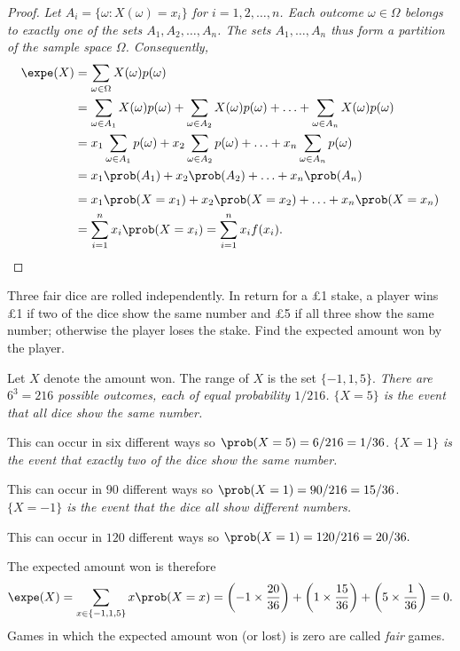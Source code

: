 \begin{proof}
\bit
\it Let $A_i = \{\omega: X(\omega) = x_i\}$ for $i=1,2,\ldots,n$.
\it Each outcome $\omega\in\Omega$ belongs to exactly one of the sets $A_1,A_2,\ldots,A_n$.
\it The sets $A_1,\ldots,A_n$ thus form a partition of the sample space $\Omega$.
\eit
Consequently, 
\begin{align*}
\expe(X) 
	& = \sum_{\omega\in\Omega} X(\omega)p(\omega) \\
	& = \sum_{\omega\in A_1} X(\omega)p(\omega) + \sum_{\omega\in A_2} X(\omega)p(\omega) + \ldots + \sum_{\omega\in A_n} X(\omega)p(\omega) \\
	& = x_1\sum_{\omega\in A_1}p(\omega) + x_2\sum_{\omega\in A_2} p(\omega) + \ldots + x_n\sum_{\omega\in A_n} p(\omega) \\
	& = x_1\prob(A_1) + x_2\prob(A_2) + \ldots + x_n\prob(A_n) \\[1ex]
	& = x_1\prob(X=x_1) + x_2\prob(X=x_2) + \ldots + x_n\prob(X=x_n) \\
	& = \sum_{i=1}^n x_i \prob(X=x_i)
	= \sum_{i=1}^n x_i f(x_i).
\end{align*}
\end{proof}

\begin{example}
Three fair dice are rolled independently. In return for a \pounds 1 stake, a player wins \pounds 1 if two of the dice show the same number and \pounds 5 if all three show the same number; otherwise the player loses the stake. Find the expected amount won by the player.
\begin{solution}
Let $X$ denote the amount won. The range of $X$ is the set $\{-1,1,5\}$.
\bit
\it There are $6^3 = 216$ possible outcomes, each of equal probability $1/216$.
\it $\{X=5\}$ is the event that all dice show the same number.
\par This can occur in six different ways so $\prob(X=5) = 6/216 = 1/36$.
\it $\{X=1\}$ is the event that exactly two of the dice show the same number.
\par This can occur in $90$ different ways so $\prob(X=1) = 90/216 = 15/36$.
\it $\{X=-1\}$ is the event that the dice all show different numbers.
\par This can occur in $120$ different ways so $\prob(X=1) = 120/216 = 20/36.$
\eit

The expected amount won is therefore
\[
\expe(X) = \sum_{x\in\{-1,1,5\}} x\prob(X=x)
	= \left(-1\times\frac{20}{36}\right) +\left(1\times\frac{15}{36}\right) +\left(5\times\frac{1}{36}\right) 
	= 0.
\]
Games in which the expected amount won (or lost) is zero are called \emph{fair} games.
\end{solution}
\end{example}


